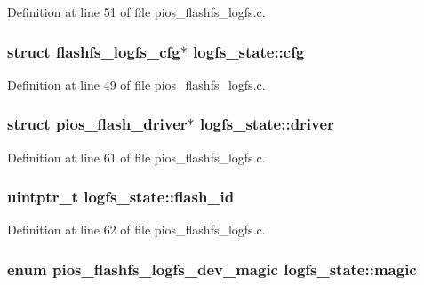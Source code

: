 \-Definition at line 51 of file pios\-\_\-flashfs\-\_\-logfs.\-c.

\hypertarget{structlogfs__state_a75d82104dc14290000c26f57140773e6}{
\subsubsection[{cfg}]{\setlength{\rightskip}{0pt plus 5cm}struct {\bf flashfs\-\_\-logfs\-\_\-cfg}$\ast$ {\bf logfs\-\_\-state\-::cfg}}}\label{structlogfs__state_a75d82104dc14290000c26f57140773e6}


\-Definition at line 49 of file pios\-\_\-flashfs\-\_\-logfs.\-c.

\hypertarget{structlogfs__state_a4bbe3d2fb54bc597953a0cf979ac57f3}{
\subsubsection[{driver}]{\setlength{\rightskip}{0pt plus 5cm}struct {\bf pios\-\_\-flash\-\_\-driver}$\ast$ {\bf logfs\-\_\-state\-::driver}}}\label{structlogfs__state_a4bbe3d2fb54bc597953a0cf979ac57f3}


\-Definition at line 61 of file pios\-\_\-flashfs\-\_\-logfs.\-c.

\hypertarget{structlogfs__state_a29a28723508e259cd39e4ce4bff7827d}{
\subsubsection[{flash\-\_\-id}]{\setlength{\rightskip}{0pt plus 5cm}uintptr\-\_\-t {\bf logfs\-\_\-state\-::flash\-\_\-id}}}\label{structlogfs__state_a29a28723508e259cd39e4ce4bff7827d}


\-Definition at line 62 of file pios\-\_\-flashfs\-\_\-logfs.\-c.

\hypertarget{structlogfs__state_acbcddf457808c9af84d6441f4f34be1e}{
\subsubsection[{magic}]{\setlength{\rightskip}{0pt plus 5cm}enum {\bf pios\-\_\-flashfs\-\_\-logfs\-\_\-dev\-\_\-magic} {\bf logfs\-\_\-state\-::magic}}}\label{structlogfs__state_acbcddf457808c9af84d6441f4f34be1e}


